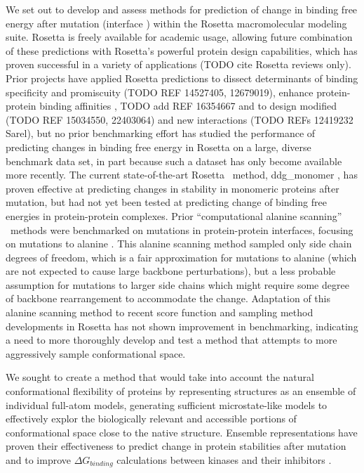We set out to develop and assess methods for prediction of change in binding free energy after mutation (interface \ddg) within the Rosetta macromolecular modeling suite. Rosetta is freely available for academic usage, allowing future combination of these predictions with Rosetta's powerful protein design capabilities, which has proven successful in a variety of applications (TODO cite Rosetta reviews only)\cite{kaufmann_practically_2010}.
Prior projects have applied Rosetta predictions to
dissect determinants of binding specificity and promiscuity (TODO REF 14527405, 12679019),
enhance protein-protein binding affinities \cite{sammond_structure-based_2007}, TODO add REF 16354667
and to design modified (TODO REF 15034550, 22403064)  and new interactions (TODO REFs 12419232 Sarel), but no prior benchmarking effort has studied the performance of predicting changes in binding free energy in Rosetta on a large, diverse benchmark data set, in part because such a dataset has only become available more recently.
The current state-of-the-art Rosetta \ddg\ method,  ddg\_monomer \cite{kellogg_role_2011}, has proven effective at predicting changes in stability in monomeric proteins after mutation, but had not yet been tested at predicting change of binding free energies in protein-protein complexes.
Prior ``computational alanine scanning'' \ddg\ methods were benchmarked on mutations in protein-protein interfaces, focusing on mutations to alanine \cite{kortemme_simple_2002,kortemme_computational_2004,conchuir_web_2015}.
This alanine scanning method sampled only side chain degrees of freedom, which is a fair approximation for mutations to alanine (which are not expected to cause large backbone perturbations\cite{cunningham_high-resolution_1989}), but a less probable assumption for mutations to larger side chains which might require some degree of backbone rearrangement to accommodate the change.
Adaptation of this alanine scanning method to recent score function and sampling method developments in Rosetta has not shown improvement in benchmarking\cite{conchuir_web_2015}, indicating a need to more thoroughly develop and test a method that attempts to more aggressively sample conformational space.

We sought to create a method that would take into account the natural conformational flexibility of proteins by representing structures as an ensemble of individual full-atom models, generating sufficient microstate-like models to effectively explor the biologically relevant and accessible portions of conformational space close to the native structure.
Ensemble representations have proven their effectiveness to predict change in protein stabilities after mutation\cite{benedix_predicting_2009} and to improve $\Delta G_{binding}$ calculations between kinases and their inhibitors \cite{araki_effect_2016}.


